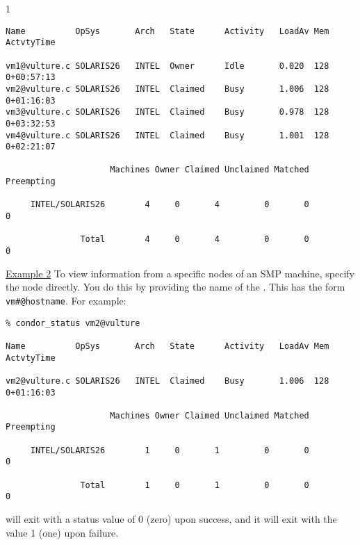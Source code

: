 \begin{ManPage}{\label{man-condor-status}}{1}
\begin{verbatim}
Name          OpSys       Arch   State      Activity   LoadAv Mem   ActvtyTime

vm1@vulture.c SOLARIS26   INTEL  Owner      Idle       0.020  128   0+00:57:13
vm2@vulture.c SOLARIS26   INTEL  Claimed    Busy       1.006  128   0+01:16:03
vm3@vulture.c SOLARIS26   INTEL  Claimed    Busy       0.978  128   0+03:32:53
vm4@vulture.c SOLARIS26   INTEL  Claimed    Busy       1.001  128   0+02:21:07

                     Machines Owner Claimed Unclaimed Matched Preempting

     INTEL/SOLARIS26        4     0       4         0       0          0

               Total        4     0       4         0       0          0
\end{verbatim}

\underline{Example 2} To view information from a specific nodes of an
SMP machine, specify the node directly.
You do this by providing the name of the .
This has the form \texttt{vm\#@hostname}.
For example:
\begin{verbatim}
% condor_status vm2@vulture

Name          OpSys       Arch   State      Activity   LoadAv Mem   ActvtyTime

vm2@vulture.c SOLARIS26   INTEL  Claimed    Busy       1.006  128   0+01:16:03

                     Machines Owner Claimed Unclaimed Matched Preempting

     INTEL/SOLARIS26        1     0       1         0       0          0

               Total        1     0       1         0       0          0
\end{verbatim}

\ExitStatus

 will exit with a status value of 0 (zero) upon success,
and it will exit with the value 1 (one) upon failure.

\end{ManPage}

